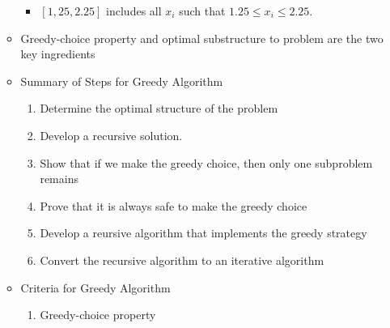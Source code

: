 \documentclass[12pt]{article}
\begin{document}
\begin{enumerate}[1.]
\begin{itemize}
        \begin{itemize}
            \item $[1,25, 2.25]$ includes all $x_i$ such that $1.25 \leq x_i \leq 2.25$.
        \end{itemize}
        \item Greedy-choice property and optimal substructure to problem are the two key ingredients
        \item Summary of Steps for Greedy Algorithm

        \begin{enumerate}[1.]
            \item Determine the optimal structure of the problem
            \item Develop a recursive solution.
            \item Show that if we make the greedy choice, then only one subproblem remains
            \item Prove that it is always safe to make the greedy choice
            \item Develop a reursive algorithm that implements the greedy strategy
            \item Convert the recursive algorithm to an iterative algorithm
        \end{enumerate}



        \item Criteria for Greedy Algorithm
        \begin{enumerate}[1.]
            \item Greedy-choice property


\end{enumerate}
\end{itemize}
\end{enumerate}
\end{document}
